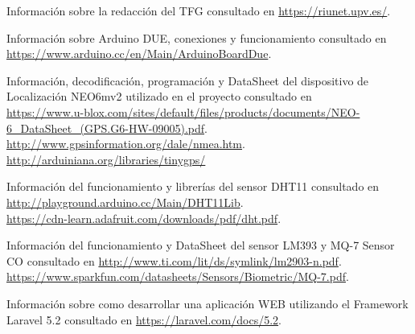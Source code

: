 \begin{thebibliography}{10}



Información sobre la redacción del TFG
\newblock consultado en 
\url{https://riunet.upv.es/}.

Información sobre Arduino DUE, conexiones y funcionamiento
\newblock consultado en 
\url{https://www.arduino.cc/en/Main/ArduinoBoardDue}.

Información, decodificación, programación y DataSheet del dispositivo de Localización NEO6mv2 utilizado en el proyecto
\newblock consultado en \\
\url{https://www.u-blox.com/sites/default/files/products/documents/NEO-6_DataSheet_(GPS.G6-HW-09005).pdf}.\\
\url{http://www.gpsinformation.org/dale/nmea.htm}.\\
\url{http://arduiniana.org/libraries/tinygps/}

Información del funcionamiento y librerías del sensor DHT11
\newblock consultado en 
\url{http://playground.arduino.cc/Main/DHT11Lib}.\\
\url{https://cdn-learn.adafruit.com/downloads/pdf/dht.pdf}.

Información del funcionamiento y DataSheet del sensor LM393 y MQ-7 Sensor CO
\newblock consultado en 
\url{http://www.ti.com/lit/ds/symlink/lm2903-n.pdf}.
\url{https://www.sparkfun.com/datasheets/Sensors/Biometric/MQ-7.pdf}.

Información sobre como desarrollar una aplicación WEB utilizando el Framework Laravel 5.2
\newblock consultado en 
\url{https://laravel.com/docs/5.2}.


\end{thebibliography}